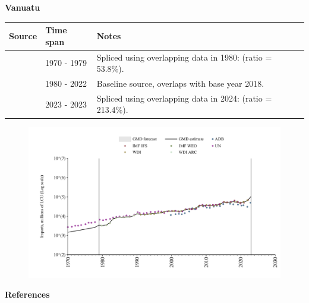 \documentclass[12pt,a4paper,landscape]{article}
\begin{document}
\begin{adjustbox}{max totalsize={\paperwidth}{\paperheight},center}
\begin{minipage}[t][\textheight][t]{\textwidth}
\vspace*{0.5cm}
{}
\begin{center}
{\Large\bfseries Vanuatu}
\end{center}
\vspace{0.5cm}
\begin{table}[H]
\centering
\small
\begin{tabular}{|l|l|l|}
\hline
\textbf{Source} & \textbf{Time span} & \textbf{Notes} \\
\hline
\rowcolor{white}\cite{UN}& 1970 - 1979 &Spliced using overlapping data in 1980: (ratio = 53.8\%).\\
\rowcolor{lightgray}\cite{WDI}& 1980 - 2022 &Baseline source, overlaps with base year 2018.\\
\rowcolor{white}\cite{ADB}& 2023 - 2023 &Spliced using overlapping data in 2024: (ratio = 213.4\%).\\
\hline
\end{tabular}
\end{table}
\begin{figure}[H]
\centering
\includegraphics[width=\textwidth,height=0.6\textheight,keepaspectratio]{graphs/VUT_imports.pdf}
\end{figure}
\end{minipage}
\end{adjustbox}
{}
\begin{center}
{\Large\bfseries References}
\end{center}
\small


\end{document}
